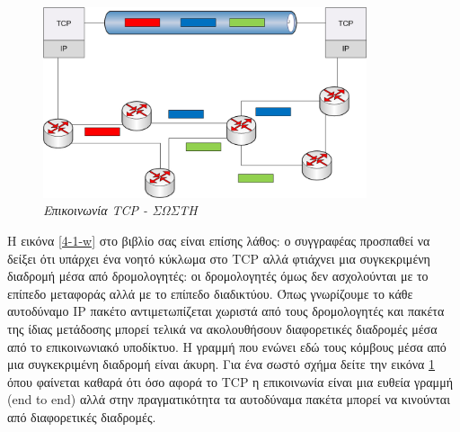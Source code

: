 \begin{figure}[!ht]
 \centering
 \includegraphics[width=0.85\textwidth]{images/chapter4/4-1-r}
 \caption {\textsl{Επικοινωνία TCP - ΣΩΣΤΗ}}
 \label{4-1-r}
\end{figure}

Η εικόνα \ref{4-1-w} στο βιβλίο σας είναι επίσης λάθος: ο συγγραφέας προσπαθεί να δείξει ότι υπάρχει ένα νοητό κύκλωμα στο TCP αλλά φτιάχνει μια συγκεκριμένη διαδρομή μέσα από δρομολογητές: οι δρομολογητές όμως δεν ασχολούνται με το επίπεδο μεταφοράς αλλά με το επίπεδο διαδικτύου. Όπως γνωρίζουμε το κάθε αυτοδύναμο IP πακέτο αντιμετωπίζεται χωριστά από τους δρομολογητές και πακέτα της ίδιας μετάδοσης μπορεί τελικά να ακολουθήσουν διαφορετικές διαδρομές μέσα από το επικοινωνιακό υποδίκτυο. Η γραμμή που ενώνει εδώ τους κόμβους μέσα από μια συγκεκριμένη διαδρομή είναι άκυρη. Για ένα σωστό σχήμα δείτε την εικόνα \ref{4-1-r} όπου φαίνεται καθαρά ότι όσο αφορά το TCP η επικοινωνία είναι μια ευθεία γραμμή (end to end) αλλά στην πραγματικότητα τα αυτοδύναμα πακέτα μπορεί να κινούνται από διαφορετικές διαδρομές.